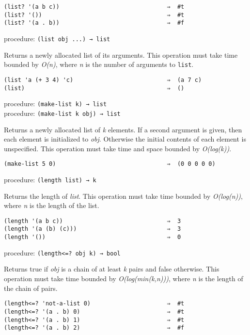 \begin{verbatim}
(list? '(a b c))                               ⇒  #t
(list? '())                                    ⇒  #t
(list? '(a . b))                               ⇒  #f
\end{verbatim}

procedure: \texttt{(list\ obj\ ...)\ →\ list}

Returns a newly allocated list of its arguments. This operation must
take time bounded by \emph{O(n)}, where \emph{n} is the number of
arguments to \texttt{list}.

\begin{verbatim}
(list 'a (+ 3 4) 'c)                           ⇒  (a 7 c)
(list)                                         ⇒  ()
\end{verbatim}

procedure: \texttt{(make-list\ k)\ →\ list}\\
procedure: \texttt{(make-list\ k\ obj)\ →\ list}

Returns a newly allocated list of \emph{k} elements. If a second
argument is given, then each element is initialized to \emph{obj}.
Otherwise the initial contents of each element is unspecified. This
operation must take time and space bounded by \emph{O(log(k))}.

\begin{verbatim}
(make-list 5 0)                                ⇒  (0 0 0 0 0)
\end{verbatim}

procedure: \texttt{(length\ list)\ →\ k}

Returns the length of \emph{list}. This operation must take time bounded
by \emph{O(log(n))}, where \emph{n} is the length of the list.

\begin{verbatim}
(length '(a b c))                              ⇒  3
(length '(a (b) (c)))                          ⇒  3
(length '())                                   ⇒  0
\end{verbatim}

procedure: \texttt{(length\textless{}=?\ obj\ k)\ →\ bool}

Returns true if \emph{obj} is a chain of at least \emph{k} pairs and
false otherwise. This operation must take time bounded by
\emph{O(log(min(k,n)))}, where \emph{n} is the length of the chain of
pairs.

\begin{verbatim}
(length<=? 'not-a-list 0)                      ⇒  #t
(length<=? '(a . b) 0)                         ⇒  #t
(length<=? '(a . b) 1)                         ⇒  #t
(length<=? '(a . b) 2)                         ⇒  #f
\end{verbatim}

